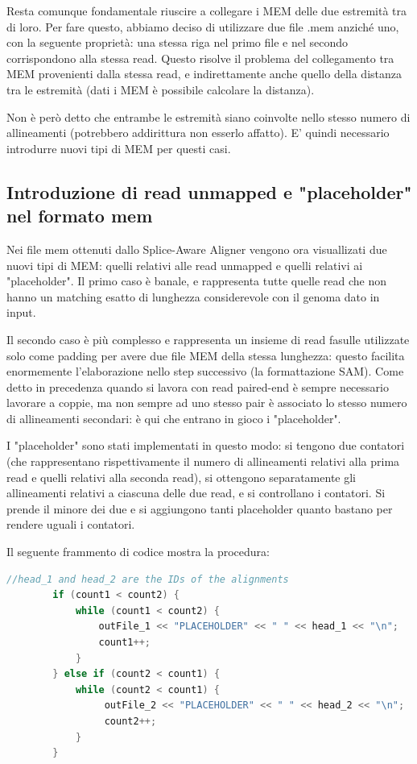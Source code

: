 Resta comunque fondamentale riuscire a collegare i MEM delle due estremità tra di loro. Per fare questo, abbiamo deciso di utilizzare due file .mem anziché uno, con la seguente proprietà: una stessa riga nel primo file e nel secondo corrispondono alla stessa read. Questo risolve il problema del collegamento tra MEM provenienti dalla stessa read, e indirettamente anche quello della distanza tra le estremità (dati i MEM è possibile calcolare la distanza).

Non è però detto che entrambe le estremità siano coinvolte nello stesso numero di allineamenti (potrebbero addirittura non esserlo affatto). E' quindi necessario introdurre nuovi tipi di MEM per questi casi.


\subsection{Introduzione di read unmapped e "placeholder" nel formato mem}
Nei file mem ottenuti dallo Splice-Aware Aligner vengono ora visuallizati due nuovi tipi di MEM: quelli relativi alle read unmapped e quelli relativi ai "placeholder". Il primo caso è banale, e rappresenta tutte quelle read che non hanno un matching esatto di lunghezza considerevole con il genoma dato in input.

Il secondo caso è più complesso e rappresenta un insieme di read fasulle utilizzate solo come padding per avere due file MEM della stessa lunghezza: questo facilita enormemente l'elaborazione nello step successivo (la formattazione SAM). Come detto in precedenza quando si lavora con read paired-end è sempre necessario lavorare a coppie, ma non sempre ad uno stesso pair è associato lo stesso numero di allineamenti secondari: è qui che entrano in gioco i "placeholder". 

I "placeholder" sono stati implementati in questo modo: si tengono due contatori (che rappresentano rispettivamente il numero di allineamenti relativi alla prima read e quelli relativi alla seconda read), si ottengono separatamente gli allineamenti relativi a ciascuna delle due read, e si controllano i contatori. Si prende il minore dei due e si aggiungono tanti placeholder quanto bastano per rendere uguali i contatori.

Il seguente frammento di codice mostra la procedura:

\begin{lstlisting}[language=C++]
        //head_1 and head_2 are the IDs of the alignments
        if (count1 < count2) {
            while (count1 < count2) {
                outFile_1 << "PLACEHOLDER" << " " << head_1 << "\n";
                count1++;
            }
        } else if (count2 < count1) {
            while (count2 < count1) {
                 outFile_2 << "PLACEHOLDER" << " " << head_2 << "\n";
                 count2++;
            }
        }
\end{lstlisting}


